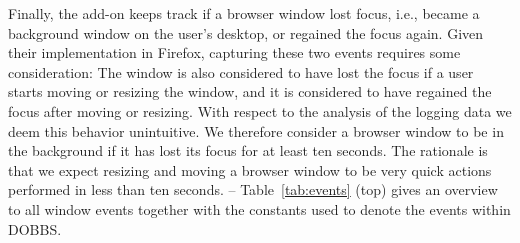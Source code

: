 \documentclass[11pt,fleqn,twoside]{article}
\begin{document}
Finally, the add-on keeps track if a browser window lost focus, i.e., became a background window on the user's desktop, or regained the focus again. Given their implementation in Firefox, capturing these two events requires some consideration: The window is also considered to have lost the focus if a user starts moving or resizing the window, and it is considered to have regained the focus after moving or resizing. With respect to the analysis of the logging data we deem this behavior unintuitive. We therefore consider a browser window to be in the background if it has lost its focus for at least ten seconds. The rationale is that we expect resizing and moving a browser window to be very quick actions performed in less than ten seconds. -- Table~\ref{tab:events} (top) gives an overview to all window events together with the constants used to denote the events within DOBBS.
\end{document}
